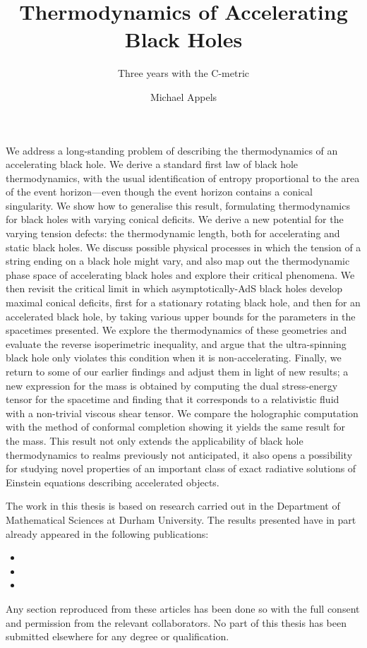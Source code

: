 \documentclass[
twoside,
openright,
frontopenright
]{dmathesis}
\begin{document}
\title{Thermodynamics of Accelerating Black Holes}
\subtitle{Three years with the C-metric}
\author{Michael Appels}
\maketitlepage*

\begin{abstract*}
  We address a long-standing problem of describing the thermodynamics of an
  accelerating black hole. We derive a standard first law of black hole
  thermodynamics, with the usual identification of entropy proportional to the
  area of the event horizon---even though the event horizon contains a conical
  singularity. We show how to generalise this result, formulating thermodynamics
  for black holes with varying conical deficits. We derive a new potential for
  the varying tension defects: the thermodynamic length, both for accelerating
  and static black holes. We discuss possible physical processes in which the
  tension of a string ending on a black hole might vary, and also map out the
  thermodynamic phase space of accelerating black holes and explore their
  critical phenomena. We then revisit the critical limit in which
  asymptotically-AdS black holes develop maximal conical deficits, first for a
  stationary rotating black hole, and then for an accelerated black hole, by
  taking various upper bounds for the parameters in the spacetimes presented. We
  explore the thermodynamics of these geometries and evaluate the reverse
  isoperimetric inequality, and argue that the ultra-spinning black hole only
  violates this condition when it is non-accelerating. Finally, we return to
  some of our earlier findings and adjust them in light of new results; a new
  expression for the mass is obtained by computing the dual stress-energy tensor
  for the spacetime and finding that it corresponds to a relativistic fluid with
  a non-trivial viscous shear tensor. We compare the holographic computation
  with the method of conformal completion showing it yields the same result for
  the mass. This result not only extends the applicability of black hole
  thermodynamics to realms previously not anticipated, it also opens a
  possibility for studying novel properties of an important class of exact
  radiative solutions of Einstein equations describing accelerated objects.
%
\end{abstract*}

\begin{declaration*}
%
  The work in this thesis is based on research carried out in the Department of
  Mathematical Sciences at Durham University. The results presented have in part
  already appeared in the following publications:
  \begin{itemize}
  \item {}
  \item {}
  \item {}
  \end{itemize}
  Any section reproduced from these articles has been done so with the full
  consent and permission from the relevant collaborators. No part of this thesis
  has been submitted elsewhere for any degree or qualification.
%
\end{declaration*}
\end{document}
